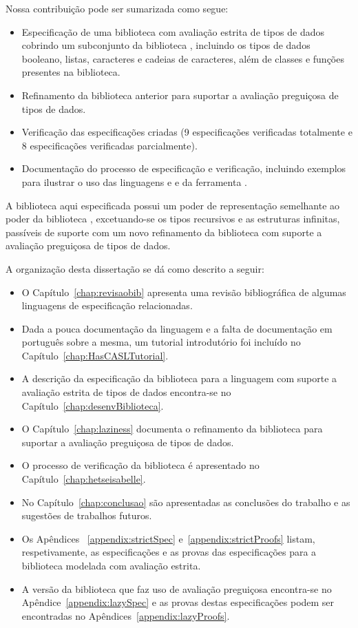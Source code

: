 Nossa contribuição pode ser sumarizada como segue:
\begin{itemize}
\item Especificação de uma biblioteca com avaliação estrita de tipos de dados cobrindo um subconjunto da biblioteca \Prelude, incluindo os tipos de dados booleano, listas, caracteres e cadeias de caracteres, além de classes e funções presentes na biblioteca.
\item Refinamento da biblioteca anterior para suportar a avaliação preguiçosa de tipos de dados.
\item Verificação das especificações criadas (9 especificações verificadas totalmente e 8 especificações verificadas parcialmente).
\item Documentação do processo de especificação e verificação, incluindo exemplos para ilustrar o uso das linguagens \HasCASL e \Hets e da ferramenta \Isabelle.
\end{itemize}

A biblioteca aqui especificada possui um poder de representação semelhante ao poder da biblioteca \Prelude, excetuando-se os tipos recursivos e as estruturas infinitas, passíveis de suporte com um novo refinamento da biblioteca com suporte a avaliação preguiçosa de tipos de dados.

A organização desta dissertação se dá como descrito a seguir:
\begin{itemize}
\item O Capítulo~\ref{chap:revisaobib} apresenta uma revisão bibliográfica de algumas linguagens de especificação relacionadas.
\item Dada a pouca documentação da linguagem \HasCASL e a falta de documentação em português sobre a mesma, um tutorial introdutório foi incluído no Capítulo~\ref{chap:HasCASLTutorial}.
\item A descrição da especificação da biblioteca para a linguagem \HasCASL com suporte a avaliação estrita de tipos de dados encontra-se no Capítulo~\ref{chap:desenvBiblioteca}. 
\item O Capítulo~\ref{chap:laziness} documenta o refinamento da biblioteca para suportar a avaliação preguiçosa de tipos de dados.
\item O processo de verificação da biblioteca é apresentado no Capítulo~\ref{chap:hetseisabelle}.
\item No Capítulo~\ref{chap:conclusao} são apresentadas as conclusões do trabalho e as sugestões de trabalhos futuros.
\item Os Apêndices ~\ref{appendix:strictSpec} e~\ref{appendix:strictProofs} listam, respetivamente, as especificações e as provas das especificações para a biblioteca modelada com avaliação estrita.
\item A versão da biblioteca que faz uso de avaliação preguiçosa encontra-se no Apêndice~\ref{appendix:lazySpec} e as provas destas especificações podem ser encontradas no Apêndices~\ref{appendix:lazyProofs}.
\end{itemize}
